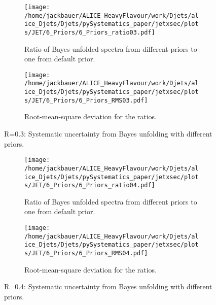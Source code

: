 \begin{figure}
\centering
\begin{subfigure}{.5\textwidth}
  \centering
  \texttt{[image: /home/jackbauer/ALICE\_HeavyFlavour/work/Djets/alice\_Djets/Djets/pySystematics\_paper/jetxsec/plots/JET/6\_Priors/6\_Priors\_ratio03.pdf]}
  \caption{Ratio of Bayes unfolded spectra from different priors to one from default prior.}
  \label{fig:sub1BayesPriorSysUncR03}
\end{subfigure}%
\begin{subfigure}{.5\textwidth}
  \centering
  \texttt{[image: /home/jackbauer/ALICE\_HeavyFlavour/work/Djets/alice\_Djets/Djets/pySystematics\_paper/jetxsec/plots/JET/6\_Priors/6\_Priors\_RMS03.pdf]}
  \caption{Root-mean-square deviation for the ratios.}
  \label{fig:sub2BayesPriorSysUncR03}
\end{subfigure}
\caption{R=0.3: Systematic uncertainty from Bayes unfolding with different priors.}
  \label{fig:BayesPriorSysUncR03}
\end{figure}

\begin{figure}
\centering
\begin{subfigure}{.5\textwidth}
  \centering
  \texttt{[image: /home/jackbauer/ALICE\_HeavyFlavour/work/Djets/alice\_Djets/Djets/pySystematics\_paper/jetxsec/plots/JET/6\_Priors/6\_Priors\_ratio04.pdf]}
  \caption{Ratio of Bayes unfolded spectra from different priors to one from default prior.}
  \label{fig:sub1BayesPriorSysUncR04}
\end{subfigure}%
\begin{subfigure}{.5\textwidth}
  \centering
  \texttt{[image: /home/jackbauer/ALICE\_HeavyFlavour/work/Djets/alice\_Djets/Djets/pySystematics\_paper/jetxsec/plots/JET/6\_Priors/6\_Priors\_RMS04.pdf]}
  \caption{Root-mean-square deviation for the ratios.}
  \label{fig:sub2BayesPriorSysUncR04}
\end{subfigure}
\caption{R=0.4: Systematic uncertainty from Bayes unfolding with different priors.}
  \label{fig:BayesPriorSysUncR04}
\end{figure}

